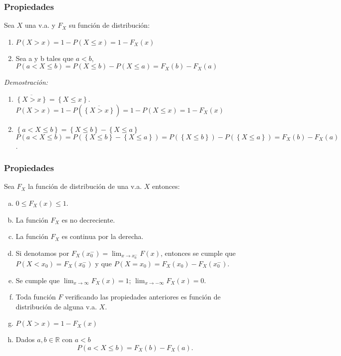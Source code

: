 \documentclass[handout]{beamer}\usepackage[]{graphicx}\usepackage[]{color}
\newcommand{\RR}{\mathbb{R}}
\renewcommand{\leq}{\leqslant}
\theoremstyle{plain}
\newtheorem{prop}{Propiedades}
\theoremstyle{definition}
\begin{document}
\begin{frame}
\frametitle{Propiedades}

Sea $X$ una v.a. y $F_{X}$ su función
de distribución:
\begin{enumerate}[1)]
    \item $P(X>x)=1-P(X\leq x)=1-F_{X}(x)$
    \item Sea a y b tales que $a<b$, $P(a<X\leq b)=P(X\leq b)-P(X\leq a)=F_{X}(b)-F_{X}(a)$
\end{enumerate}
\end{frame}
\begin{frame}
\textit{Demostración:}
\begin{enumerate}[1)]
    \item $\overline{\left\{X>x\right\}}=\left\{X\leq x\right\}$.
    $P(X>x)=1-P(\overline{\left\{X>x\right\}})=1-P(X\leq x)=1-F_{X}(x)$
    \item $\left\{a< X \leq b\right\}= \left\{X\leq b\right\}-\left\{X\leq
    a\right\}$
    $P(a<X\leq b)=P(\left\{X\leq b\right\}-\left\{X\leq
    a\right\})=P(\left\{X\leq b\right\})-P(\left\{X\leq
   a\right\})=F_{X}(b) -F_{X}(a)$.
\end{enumerate}
\end{frame}

\begin{frame}[fragile]
\frametitle{Propiedades}
       Sea $F_{X}$ la función de distribución  de una  v.a. $X$ entonces:
\begin{enumerate}[a)]
\item  $0\leq F_{X}(x)\leq 1$.
\item La función $F_{X}$ es no decreciente.
\item La función $F_{X}$ es continua por la derecha.
\item Si denotamos por $F_X(x_0^{-})=\displaystyle \lim_{x\to x_0^{-}} F(x)$,
entonces se cumple que $P(X< x_0)=F_X(x_0^{-})$ y que $P(X=x_0)=F_X(x_0)-F_X(x_0^{-})$.
\item Se cumple que $\displaystyle \lim_{x\to\infty} F_{X}(x)=1$; $\displaystyle \lim_{x\to-\infty}F_{X}(x)=0$.
\item  Toda función $F$ verificando las propiedades anteriores es función de distribución de alguna v.a. $X$.
\item $P(X>x)=1-F_{X}(x)$
\item Dados $a,b\in \RR$ con $a<b$ $$P(a<X\leq b)=F_{X}(b)-F_{X}(a).$$
\end{enumerate}
\end{frame}
\end{document}

